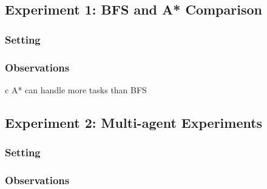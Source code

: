 \documentclass[11pt]{article}
\begin{document}
\subsection{Experiment 1: BFS and A* Comparison}


\subsubsection{Setting}

\subsubsection{Observations}
c
A* can handle more tasks than BFS


\subsection{Experiment 2: Multi-agent Experiments}

\subsubsection{Setting}

\subsubsection{Observations}
\end{document}
